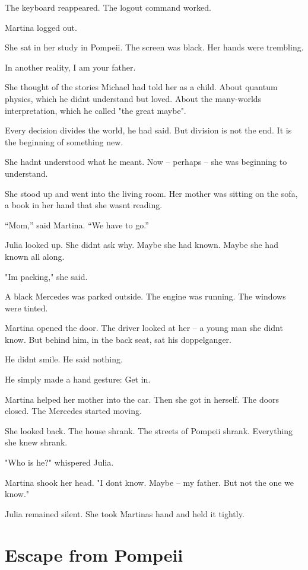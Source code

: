 \documentclass[
]{article}
\begin{document}
The keyboard reappeared. The logout command worked.

Martina logged out.

She sat in her study in Pompeii. The screen was black. Her hands were trembling.

In another reality, I am your father.

She thought of the stories Michael had told her as a child. About quantum physics, which he didn\textquotesingle t understand but loved. About the many-worlds interpretation, which he called "the great maybe".

Every decision divides the world, he had said. But division is not the end. It is the beginning of something new.

She hadn\textquotesingle t understood what he meant. Now -- perhaps -- she was beginning to understand.

She stood up and went into the living room. Her mother was sitting on the sofa, a book in her hand that she wasn\textquotesingle t reading.

``Mom,'' said Martina. ``We have to go.''

Julia looked up. She didn\textquotesingle t ask why. Maybe she had known. Maybe she had known all along.

"I\textquotesingle m packing," she said.

A black Mercedes was parked outside. The engine was running. The windows were tinted.

Martina opened the door. The driver looked at her -- a young man she didn\textquotesingle t know. But behind him, in the back seat, sat his doppelganger.

He didn\textquotesingle t smile. He said nothing.

He simply made a hand gesture: Get in.

Martina helped her mother into the car. Then she got in herself. The doors closed. The Mercedes started moving.

She looked back. The house shrank. The streets of Pompeii shrank. Everything she knew shrank.

"Who is he?" whispered Julia.

Martina shook her head. "I don\textquotesingle t know. Maybe -- my father. But not the one we know."

Julia remained silent. She took Martina\textquotesingle s hand and held it tightly.

\section{Escape from Pompeii}\label{escape-from-pompeii}
\end{document}
